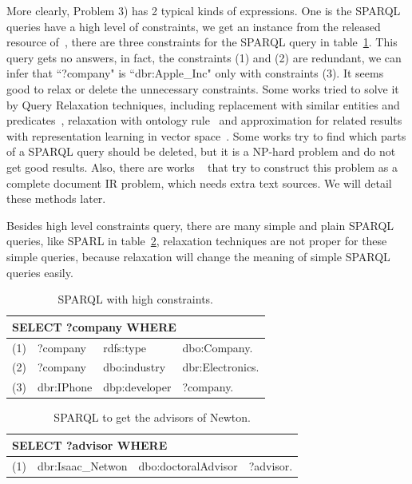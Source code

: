 \documentclass[runningheads]{llncs}
\begin{document}
More clearly, Problem 3) has 2 typical kinds of expressions.
One is the SPARQL queries have a high level of constraints, we get an instance from the released resource of~\cite{wangEmbed}, there are three constraints for the SPARQL query in table~\ref{S_Example}. This query gets no answers, in fact, the constraints (1) and (2) are redundant, we can infer that ``?company" is ``dbr:Apple\_Inc" only with constraints (3). It seems good to relax or delete the unnecessary constraints. Some works tried to solve it by Query Relaxation techniques, including replacement with similar entities and predicates~\cite{elbassuoni2011query}, relaxation with ontology rule~\cite{2010combining} and approximation for related results with representation learning in vector space~\cite{wangEmbed, hamilton2018embedding, zhang2018trquery}. Some works try to find which parts of a SPARQL query should be deleted, but it is a NP-hard problem and do not get good results. Also, there are works ~\cite{huang2012} that try to construct this problem as a complete document IR problem, which needs extra text sources. We will detail these methods later.

Besides high level constraints query, there are many simple and plain SPARQL queries, like SPARL in table~\ref{Newton}, relaxation techniques are not proper for these simple queries, because relaxation will change the meaning of simple SPARQL queries easily.

\begin{table}
\caption{SPARQL with high constraints.}\label{S_Example}
\centering
\begin{tabular}{|c|lll|}
\hline
\multicolumn{4}{|l|}{SELECT ?company WHERE }\\
\hline
(1) &  ?company & rdfs:type & dbo:Company.\\
(2) &  ?company  & dbo:industry  & dbr:Electronics.\\
(3) & dbr:IPhone & dbp:developer & ?company.\\
\hline
\end{tabular}
\end{table}

\begin{table}
\caption{SPARQL to get the advisors of Newton.}\label{Newton}
\centering
\begin{tabular}{|c|lll|}
\hline
\multicolumn{4}{|l|}{SELECT ?advisor WHERE }\\
\hline
(1) &  dbr:Isaac\_Netwon & dbo:doctoralAdvisor & ?advisor.\\
\hline
\end{tabular}
\end{table}
\end{document}
